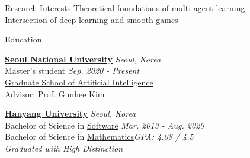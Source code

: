 \documentclass{resume} %
\begin{document}
	
	

\begin{rSection}{Research Interests}
	Theoretical foundations of multi-agent learning \\
	Intersection of deep learning and smooth games
\end{rSection}
	


\begin{rSection}{Education}

{\bf \href{https://www.snu.ac.kr/index.html}{Seoul National University}} \hfill{\em Seoul, Korea} \\
Master's student \hfill {\em Sep. 2020 - Present} \\ 
\href{https://gsai.snu.ac.kr/}{Graduate School of Artificial Intelligence} \\
Advisor: \href{https://vision.snu.ac.kr/gunhee/}{Prof. Gunhee Kim}


{\bf \href{https://www.hanyang.ac.kr/}{Hanyang University}} \hfill{\em Seoul, Korea} \\
Bachelor of Science in \href{http://cs.hanyang.ac.kr/}{Software} \hfill {\em Mar. 2013 - Aug. 2020} \\ 
Bachelor of Science in \href{http://math.hanyang.ac.kr}{Mathematics}\hfill{\em GPA: 4.08 / 4.5} \\
\textit{Graduated with High Distinction}
\end{rSection}

\end{document}
